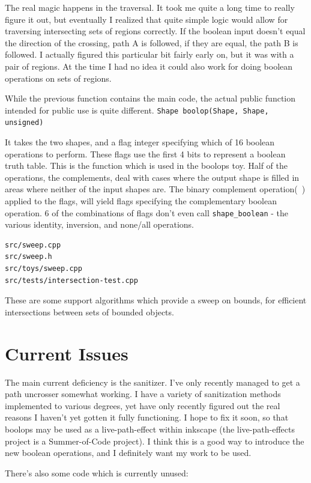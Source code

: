 \documentclass[openany]{book}
\begin{document}
The real magic happens in the traversal. It took me quite a long time to really figure it out, but eventually I realized that quite simple logic would allow for traversing intersecting sets of regions correctly. If the boolean input doesn't equal the direction of the crossing, path A is followed, if they are equal, the path B is followed. I actually figured this particular bit fairly early on, but it was with a pair of regions. At the time I had no idea it could also work for doing boolean operations on sets of regions.

While the previous function contains the main code, the actual public function intended for public use is quite different.
\verb|Shape boolop(Shape, Shape, unsigned)|

It takes the two shapes, and a flag integer specifying which of 16 boolean operations to perform. These flags use the first 4 bits to represent a boolean truth table. This is the function which is used in the boolops toy. Half of the operations, the complements, deal with cases where the output shape is filled in areas where neither of the input shapes are. The binary complement operation(~) applied to the flags, will yield flags specifying the complementary boolean operation. 6 of the combinations of flags don't even call \verb|shape_boolean| - the various identity, inversion, and none/all operations.

\begin{verbatim}
src/sweep.cpp
src/sweep.h
src/toys/sweep.cpp
src/tests/intersection-test.cpp
\end{verbatim}

These are some support algorithms which provide a sweep on bounds, for efficient intersections between sets of bounded objects.
\section{Current Issues}

The main current deficiency is the sanitizer. I've only recently managed to get a path uncrosser somewhat working. I have a variety of sanitization methods implemented to various degrees, yet have only recently figured out the real reasons I haven't yet gotten it fully functioning. I hope to fix it soon, so that boolops may be used as a live-path-effect within inkscape (the live-path-effects project is a Summer-of-Code project). I think this is a good way to introduce the new boolean operations, and I definitely want my work to be used.

There's also some code which is currently unused:
\end{document}
